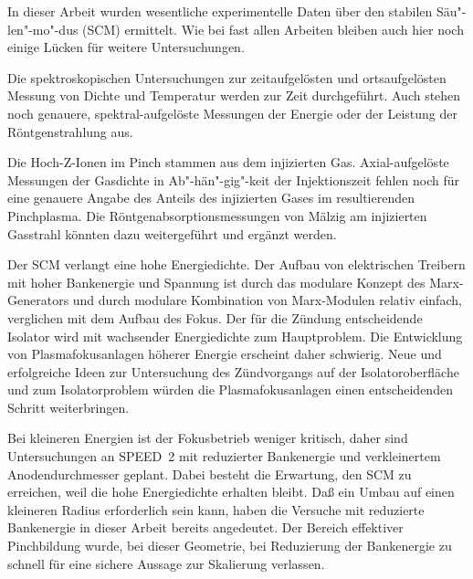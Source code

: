 %
%
\label{sec:ausblick}
%
In dieser Arbeit wurden wesentliche experimentelle Daten über den
stabilen Säu"-len"-mo"-dus (SCM) ermittelt. Wie bei fast allen
Arbeiten bleiben auch hier noch einige Lücken für weitere
Untersuchungen.
\par
Die spektroskopischen Untersuchungen zur zeitaufgelösten und
ortsaufgelösten Messung von Dichte und Temperatur werden zur Zeit
durchgeführt. Auch stehen noch genauere, spektral-aufgelöste Messungen
der Energie oder der Leistung der Röntgenstrahlung aus.
\par
Die Hoch-Z-Ionen im Pinch stammen aus dem injizierten Gas.
Axial-aufgelöste Messungen der Gasdichte in Ab"-hän"-gig"-keit der
Injektionszeit fehlen noch für eine genauere Angabe des Anteils
des injizierten Gases im resultierenden Pinchplasma. Die
Röntgenabsorptionsmessungen von Mälzig am injizierten Gasstrahl
könnten dazu weitergeführt und ergänzt werden.
\par
Der SCM verlangt eine hohe Energiedichte. Der Aufbau von elektrischen
Treibern mit hoher Bankenergie und Spannung ist durch das modulare
Konzept des Marx-Generators und durch modulare Kombination von
Marx-Modulen relativ einfach, verglichen mit dem Aufbau des Fokus. Der
für die Zündung entscheidende Isolator wird mit wachsender
Energiedichte zum Hauptproblem. Die Entwicklung von Plasmafokusanlagen
höherer Energie erscheint daher schwierig. Neue und erfolgreiche Ideen
zur Untersuchung des Zündvorgangs auf der Isolatoroberfläche und zum
Isolatorproblem würden die Plasmafokusanlagen einen entscheidenden
Schritt weiterbringen.
\par
Bei kleineren Energien ist der Fokusbetrieb weniger kritisch, daher
sind Untersuchungen an SPEED~2 mit reduzierter Bankenergie und
verkleinertem Anodendurchmesser geplant. Dabei besteht die Erwartung,
den SCM zu erreichen, weil die hohe Energiedichte erhalten bleibt. Daß
ein Umbau auf einen kleineren Radius erforderlich sein kann, haben die
Versuche mit reduzierte Bankenergie in dieser Arbeit bereits
angedeutet. Der Bereich effektiver Pinchbildung wurde, bei dieser
Geometrie, bei Reduzierung der Bankenergie zu schnell für eine sichere
Aussage zur Skalierung verlassen.
\par
